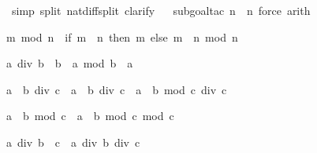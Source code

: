 \begin{isabellebody}
%
\isadelimproof
%
\endisadelimproof
%
\isatagproof
{}\isamarkupfalse%
\ {\isacharparenleft}simp\ split{\isacharcolon}\ nat{\isacharunderscore}diff{\isacharunderscore}split{\isacharcomma}\ clarify{\isacharparenright}\isanewline
\ %
\isanewline
{}\isamarkupfalse%
\ {\isacharparenleft}subgoal{\isacharunderscore}tac\ {\isachardoublequoteopen}n{\isacharequal}{}\ {\isacharbar}\ n{\isacharequal}{}{\isachardoublequoteclose}{\isacharcomma}\ force{\isacharcomma}\ arith{\isacharparenright}\isanewline
{}\isamarkupfalse%
%
\endisatagproof
{\isafoldproof}%
%
\isadelimproof
%
\endisadelimproof
%
\begin{isamarkuptext}%
\begin{isabelle}%
m\ mod\ n\ {\isacharequal}\ {\isacharparenleft}if\ m\ {\isacharless}\ n\ then\ m\ else\ {\isacharparenleft}m\ {\isacharminus}\ n{\isacharparenright}\ mod\ n{\isacharparenright}%
\end{isabelle}

\begin{isabelle}%
a\ div\ b\ {\isacharasterisk}\ b\ {\isacharplus}\ a\ mod\ b\ {\isacharequal}\ a%
\end{isabelle}


\begin{isabelle}%
a\ {\isacharasterisk}\ b\ div\ c\ {\isacharequal}\ a\ {\isacharasterisk}\ {\isacharparenleft}b\ div\ c{\isacharparenright}\ {\isacharplus}\ a\ {\isacharasterisk}\ {\isacharparenleft}b\ mod\ c{\isacharparenright}\ div\ c%
\end{isabelle}

\begin{isabelle}%
a\ {\isacharasterisk}\ b\ mod\ c\ {\isacharequal}\ a\ {\isacharasterisk}\ {\isacharparenleft}b\ mod\ c{\isacharparenright}\ mod\ c%
\end{isabelle}

\begin{isabelle}%
a\ div\ {\isacharparenleft}b\ {\isacharasterisk}\ c{\isacharparenright}\ {\isacharequal}\ a\ div\ b\ div\ c%
\end{isabelle}


\end{isamarkuptext}
\end{isabellebody}

